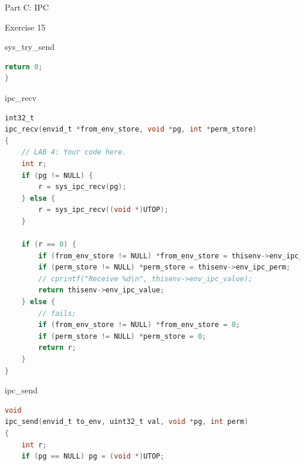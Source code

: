 \documentclass[GBK,winfonts,a4paper,10pt]{ctexart}
\begin{document}
\begin{section}{ Part C: IPC }
\begin{subsection}{ Exercise 15 }
\begin{subsection}{ sys\_try\_send }
\begin{lstlisting}[language = C]
	return 0;
}
\end{lstlisting}
\end{subsection}

\begin{subsection}{ ipc\_recv }
\begin{lstlisting}[language = C]
int32_t
ipc_recv(envid_t *from_env_store, void *pg, int *perm_store)
{
	// LAB 4: Your code here.
	int r;
	if (pg != NULL) {
		r = sys_ipc_recv(pg);
	} else {
		r = sys_ipc_recv((void *)UTOP);
	}

	if (r == 0) {
		if (from_env_store != NULL) *from_env_store = thisenv->env_ipc_from;
		if (perm_store != NULL) *perm_store = thisenv->env_ipc_perm;
		// cprintf("Receive %d\n", thisenv->env_ipc_value);
		return thisenv->env_ipc_value;
	} else {
		// fails;
		if (from_env_store != NULL) *from_env_store = 0;
		if (perm_store != NULL) *perm_store = 0;
		return r;
	}
}
\end{lstlisting}
\end{subsection}

\begin{subsection}{ ipc\_send }
\begin{lstlisting}[language = C]
void
ipc_send(envid_t to_env, uint32_t val, void *pg, int perm)
{
	int r;
	if (pg == NULL) pg = (void *)UTOP;
	

\end{lstlisting}
\end{subsection}
\end{subsection}
\end{section}
\end{document}
